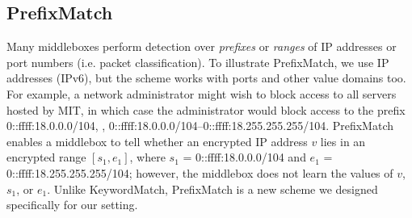 %
%
%
%
%
%
%
%
%
%
%
%

\subsection{PrefixMatch} \label{sec:range}


Many middleboxes perform detection over {\it prefixes} or {\it ranges} of  IP addresses or port numbers  (i.e. packet classification). To illustrate PrefixMatch, we use IP addresses (IPv6), but the scheme works with 
ports and other value domains too.
For example, a network administrator might wish to block access to all servers hosted by MIT, in which case the administrator would block access to the prefix 0::ffff:18.0.0.0/104, \ie{}, 0::ffff:18.0.0.0/104--0::ffff:18.255.255.255/104. 
PrefixMatch enables a middlebox to tell whether an encrypted IP address $v$ lies in an encrypted range $[s_1, e_1]$, where $s_1$ = 0::ffff:18.0.0.0/104 and $e_1$ = 0::ffff:18.255.255.255/104; however, the middlebox does not learn the values of $v$, $s_1$, or $e_1$. Unlike KeywordMatch, PrefixMatch is a new scheme we designed specifically for our setting.



